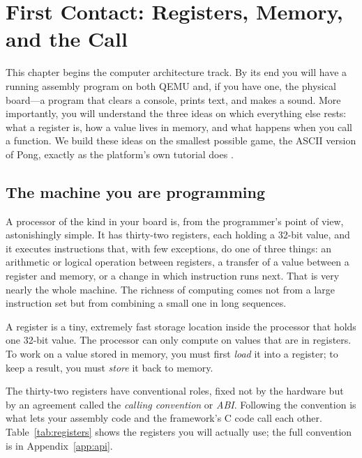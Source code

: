 \chapter{First Contact: Registers, Memory, and the Call}
\label{ch:asm1}

This chapter begins the computer architecture track. By its end you will have a
running \riscv assembly program on both QEMU and, if you have one, the physical
board---a program that clears a console, prints text, and makes a sound. More
importantly, you will understand the three ideas on which everything else rests:
what a register is, how a value lives in memory, and what happens when you call a
function. We build these ideas on the smallest possible game, the ASCII version
of Pong, exactly as the platform's own tutorial does \citep{prg32tutorialascii}.

\section{The machine you are programming}

A \riscv processor of the kind in your board is, from the programmer's point of
view, astonishingly simple. It has thirty-two registers, each holding a 32-bit
value, and it executes instructions that, with few exceptions, do one of three
things: an arithmetic or logical operation between registers, a transfer of a
value between a register and memory, or a change in which instruction runs next.
That is very nearly the whole machine. The richness of computing comes not from a
large instruction set but from combining a small one in long sequences.

\begin{prgconcept}
A register is a tiny, extremely fast storage location inside the processor that
holds one 32-bit value. The processor can only compute on values that are in
registers. To work on a value stored in memory, you must first \emph{load} it
into a register; to keep a result, you must \emph{store} it back to memory.
\end{prgconcept}

The thirty-two registers have conventional roles, fixed not by the hardware but
by an agreement called the \emph{calling convention} or \emph{ABI}. Following the
convention is what lets your assembly code and the framework's C code call each
other. Table~\ref{tab:registers} shows the registers you will actually use; the
full convention is in Appendix~\ref{app:api}.

